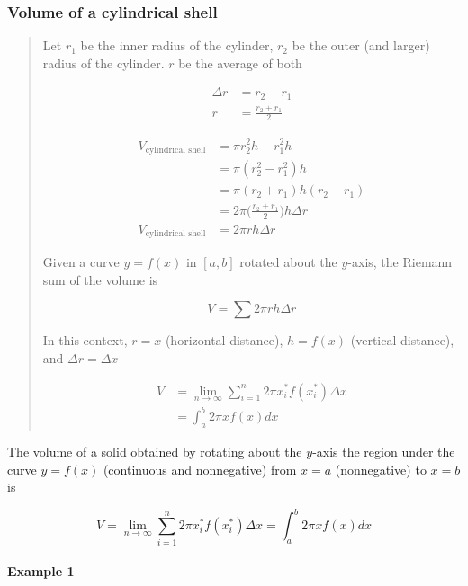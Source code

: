 \documentclass[
]{article}
\begin{document}
\hypertarget{volume-of-a-cylindrical-shell}{%
\subsubsection{Volume of a cylindrical
shell}\label{volume-of-a-cylindrical-shell}}

\begin{quote}
Let \(r_1\) be the inner radius of the cylinder, \(r_2\) be the outer
(and larger) radius of the cylinder. \(r\) be the average of both

\begin{align*}
\Delta r &= r_2 - r_1 \\
r &= \frac{r_2+r_1}{2}
\end{align*}

\begin{align*}
V_{\text{cylindrical shell}} &= \pi r_2^2 h - r_1^2 h \\
&= \pi(r_2^2 - r_1^2)h \\
&= \pi(r_2+r_1)h(r_2-r_1) \\
&= 2\pi \Bigg(\frac{r_2+r_1}{2}\Bigg) h \Delta r \\
V_{\text{cylindrical shell}} &= 2\pi r h \Delta r
\end{align*}

Given a curve \(y=f(x)\) in \([a,b]\) rotated about the \(y\)-axis, the
Riemann sum of the volume is

\[ V = \sum 2\pi r h \Delta r \]

In this context, \(r = x\) (horizontal distance), \(h = f(x)\) (vertical
distance), and \(\Delta r = \Delta x\)

\begin{align*}
V &= \lim_{n \to\infty} \sum_{i=1}^n 2\pi x_i^* f(x_i^*) \Delta x \\
&= \int_a^b 2\pi xf(x)dx
\end{align*}
\end{quote}

The volume of a solid obtained by rotating about the \(y\)-axis the
region under the curve \(y = f(x)\) (continuous and nonnegative) from
\(x=a\) (nonnegative) to \(x = b\) is

\[ V = \lim_{n \to\infty} \sum_{i=1}^n 2\pi x_i^* f(x_i^*) \Delta x = \int_a^b 2\pi xf(x)dx \]

\hypertarget{example-1-4}{%
\paragraph*{Example 1}\label{example-1-4}}
\end{document}
